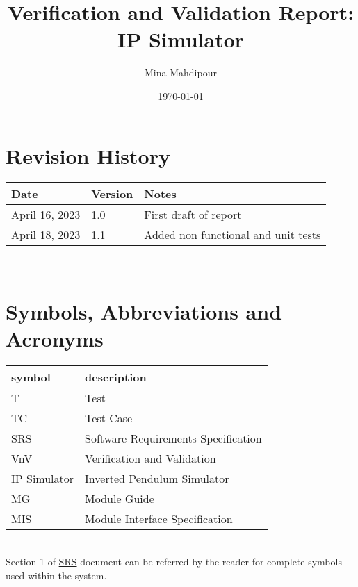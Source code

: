 \documentclass[12pt, titlepage]{article}
\begin{document}
\title{Verification and Validation Report: IP Simulator} 
\author{Mina Mahdipour}
\date{\today}
	
\maketitle
{}

\section{Revision History}

\begin{tabularx}{\textwidth}{p{3cm}p{2cm}X}
\toprule {\bf Date} & {\bf Version} & {\bf Notes}\\
\midrule
April 16, 2023 & 1.0 & First draft of report\\
April 18, 2023 & 1.1 & Added non functional and unit tests\\

\bottomrule
\end{tabularx}

~\newpage

\section{Symbols, Abbreviations and Acronyms}

\renewcommand{\arraystretch}{1.2}
\begin{tabular}{l l} 
  \toprule		
  \textbf{symbol} & \textbf{description}\\
  \midrule 
  T & Test\\
    TC & Test Case\\
  SRS & Software Requirements Specification\\
  VnV & Verification and Validation\\
  IP Simulator & Inverted Pendulum Simulator\\
  MG& Module Guide\\
  MIS&Module Interface Specification\\
  \bottomrule
\end{tabular}\\

Section 1 of \href{https://github.com/MinMah23/CAS741-Project/tree/main/docs/SRS/SRS.pdf}{SRS} document can be referred by the reader for complete symbols used within the system.

\newpage

\tableofcontents
\end{document}
